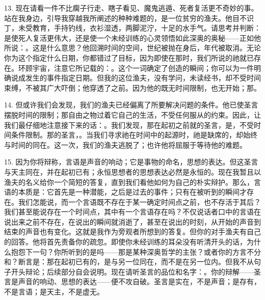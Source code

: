 13. 现在请看一件不比瘸子行走、瞎子看见、魔鬼逃遁、死者复活更不奇妙的事。站在我身边，引导我穿越我所阐述的种种难题的，是一位贫穷的渔夫。他目不识丁，未受教育，手持钓线，衣衫湿透，两脚泥泞，十足的水手气。请思考并判断：是使死人复活更伟大，还是使一个未经训练的心灵领悟如此深奥的奥秘——正如他所说：。这是什么意思？他回溯时间的空间，世纪被抛在身后，年代被取消。无论你为这个指定什么日期，你都错过了目标，因为即使在那时，我们所说的祂就已存在。环顾宇宙，注意它所记载的：。这个一词确定了创造的瞬间；你可以为一件明确说成发生的事件指定日期。但我的这位渔夫，没有学问，未读经书，却不受时间束缚，不被其广大吓倒；他穿透了之前。因为他的既无时间限制，也无开始；那。\par

14. 但或许我们会发现，我们的渔夫已经偏离了所要解决问题的条件。他已使圣言摆脱时间的限制；那自由之物过着它自己的生活，不受任何服从的约束。因此，让我们最仔细地注意接下来的话：。我们发现，那在起初之前就的圣言，是，不受时间条件限制。那的圣言，。当我们寻求祂在时间中的起源时，祂是缺席的，却始终与时间的同在。这一次，我们的渔夫逃脱了；也许他将屈服于等待他的难题。\par

15. 因为你将辩称，言语是声音的响动；它是事物的命名，思想的表达。但这圣言与天主同在，并在起初已有；永恒思想者的思想表达必然是永恒的。现在我暂且以渔夫的名义给你一个简短的答复，直到我们看他如何为自己的朴实辩护。那么，言语的本质是：它首先是一种潜能，之后是过去的事件；只有在被听到的瞬间才存在。我们怎能说，而一个言语既不存在于某一确定时间点之前，也不存活于其后？我们甚至能说存在一个时间点，其中有一个言语存在吗？不仅说话者口中的言语在说出来之前不存在，在说出的瞬间就消逝了，甚至在说出的时刻，从开始的声音到结束的声音也有变化。这就是我作为旁观者所想到的答复。但你的对手渔夫有自己的回答。他将首先责备你的疏忽。即使你未经训练的耳朵没有听清开头的话，为什么抱怨下一句？你所听到的是吗——那是某种深奥哲学的主张？或者你的方言不分和？断言是：那在起初已有的，是与另一位同在，而不是在另一位内。但我不从句子开头辩论；后续部分自会说明。现在请听圣言的品位和名字：。你的辩解——圣言是声音的响动、思想的表达——便不攻自破。圣言是实在，不是声音；是存有，不是言语；是天主，不是虚无。\par

